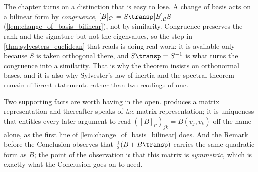
\begin{ainote}
The chapter turns on a distinction that is easy to lose. A change of basis acts
on a bilinear form by \emph{congruence},
$[B]_{\mathcal{C}'} = S\transp [B]_{\mathcal{C}} S$
(\cref{lem:change_of_basis_bilinear}), not by similarity. Congruence preserves
the rank and the signature but not the eigenvalues, so the step in
\cref{thm:sylvesters_euclidean} that reads  is doing real work: it is available only because $S$ is taken
orthogonal there, and $S\transp = S^{-1}$ is what turns the congruence into a
similarity. That is why the theorem insists on orthonormal bases, and it is also
why Sylvester's law of inertia and the spectral theorem remain different
statements rather than two readings of one.

Two supporting facts are worth having in the open.
 produces a matrix representation and
thereafter speaks of \emph{the} matrix representation; it is uniqueness that
entitles every later argument to read $([B]_{\mathcal{C}})_{jk} = B(v_j, v_k)$
off the name alone, as the first line of \cref{lem:change_of_basis_bilinear}
does. And the Remark before the Conclusion observes that
$\frac{1}{2}(B + B\transp)$ carries the same quadratic form as $B$; the point of
the observation is that this matrix is \emph{symmetric}, which is exactly what
the Conclusion goes on to need.
\end{ainote}


